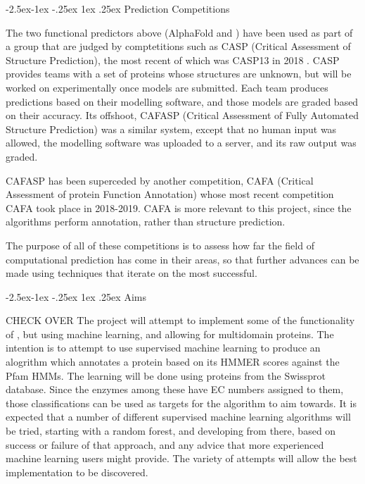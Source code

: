 \documentclass[12pt]{article}
\makeatletter
\renewcommand\subsection{\@startsection{subsection}{4}{\z@}
            {-2.5ex\@plus -1ex \@minus -.25ex}
            {1ex \@plus .25ex}
            {\normalfont\Large\bfseries}}
\makeatother
\begin{document}
		\subsection{Prediction Competitions}
		\label{intro:competitions}
			
			The two functional predictors above (AlphaFold and \cite{RefWorks:doc:5d89ec21e4b02d8374a7bbe7}) have been used as part of a group that are judged by comptetitions such as CASP (Critical Assessment of Structure Prediction), the most recent of which was CASP13 in 2018 \citep{RefWorks:doc:5d822fa4e4b0fa10423c5184}.  CASP provides teams with a set of proteins whose structures are unknown, but will be worked on experimentally once models are submitted.  Each team produces predictions based on their modelling software, and those models are graded based on their accuracy.  Its offshoot, CAFASP (Critical Assessment of Fully Automated Structure Prediction) was a similar system, except that no human input was allowed, the modelling software was uploaded to a server, and its raw output was graded.  
		
			CAFASP has been superceded by another competition, CAFA (Critical Assessment of protein Function Annotation) \citep{RefWorks:doc:5d82345ae4b09beeb95d60bb} whose most recent competition CAFA took place in 2018-2019.  CAFA is more relevant to this project, since the algorithms perform annotation, rather than structure prediction.  
		
			The purpose of all of these competitions is to assess how far the field of computational prediction has come in their areas, so that further advances can be made using techniques that iterate on the most successful.
			
		\subsection{Aims}
		
			\color{red} CHECK OVER \color{black}The project will attempt to implement some of the functionality of \cite{RefWorks:doc:5d88bf0fe4b037ddf3555c0b}, but using machine learning, and allowing for multidomain proteins.  The intention is to attempt to use supervised machine learning to produce an alogrithm which annotates a protein based on its HMMER scores against the Pfam HMMs.  The learning will be done using proteins from the Swissprot database.  Since the enzymes among these have EC numbers assigned to them, those classifications can be used as targets for the algorithm to aim towards.  It is expected that a number of different supervised machine learning algorithms will be tried, starting with a random forest, and developing from there, based on success or failure of that approach, and any advice that more experienced machine learning users might provide.  The variety of attempts will allow the best implementation to be discovered. 
		
\end{document}
